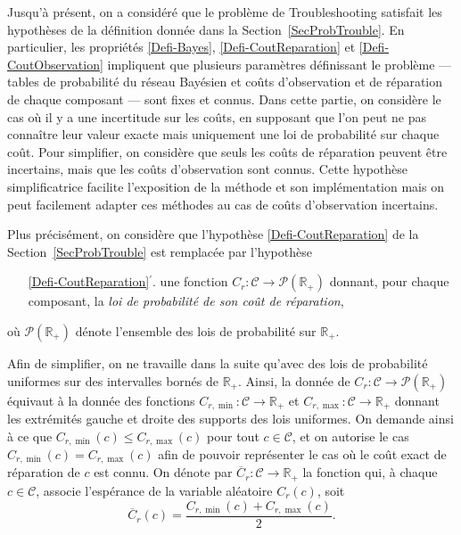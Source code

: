 \documentclass[a4paper,11pt]{article}
\theoremstyle{plain}
\theoremstyle{definition}
\begin{document}
Jusqu'à présent, on a considéré que le problème de Troubleshooting satisfait les hypothèses de la définition donnée dans la Section~\ref{SecProbTrouble}. En particulier, les propriétés \ref{Defi-Bayes}, \ref{Defi-CoutReparation} et \ref{Defi-CoutObservation} impliquent que plusieurs paramètres définissant le problème --- tables de probabilité du réseau Bayésien et coûts d'observation et de réparation de chaque composant --- sont fixes et connus. Dans cette partie, on considère le cas où il y a une incertitude sur les coûts, en supposant que l'on peut ne pas connaître leur valeur exacte mais uniquement une loi de probabilité sur chaque coût. Pour simplifier, on considère que seuls les coûts de réparation peuvent être incertains, mais que les coûts d'observation sont connus. Cette hypothèse simplificatrice facilite l'exposition de la méthode et son implémentation mais on peut facilement adapter ces méthodes au cas de coûts d'observation incertains.

Plus précisément, on considère que l'hypothèse \ref{Defi-CoutReparation} de la Section~\ref{SecProbTrouble} est remplacée par l'hypothèse
\begin{enumerate}
\item[\ref{Defi-CoutReparation}$^\prime$.] une fonction $C_r: \mathcal C \to \mathcal P(\mathbb R_+)$ donnant, pour chaque composant, la \emph{loi de probabilité de son coût de réparation},
\end{enumerate}
où $\mathcal P(\mathbb R_+)$ dénote l'ensemble des lois de probabilité sur $\mathbb R_+$.

Afin de simplifier, on ne travaille dans la suite qu'avec des lois de probabilité uniformes sur des intervalles bornés de $\mathbb R_+$. Ainsi, la donnée de $C_r: \mathcal C \to \mathcal P(\mathbb R_+)$ équivaut à la donnée des fonctions $C_{r, \min}: \mathcal C \to \mathbb R_+$ et $C_{r, \max}: \mathcal C \to \mathbb R_+$ donnant les extrémités gauche et droite des supports des lois uniformes. On demande ainsi à ce que $C_{r, \min}(c) \leq C_{r, \max}(c)$ pour tout $c \in \mathcal C$, et on autorise le cas $C_{r, \min}(c) = C_{r, \max}(c)$ afin de pouvoir représenter le cas où le coût exact de réparation de $c$ est connu. On dénote par $\overline C_r: \mathcal C \to \mathbb R_+$ la fonction qui, à chaque $c \in \mathcal C$, associe l'espérance de la variable aléatoire $C_r(c)$, soit
\[\overline C_r(c) = \frac{C_{r, \min}(c) + C_{r, \max}(c)}{2}.\]
\end{document}
